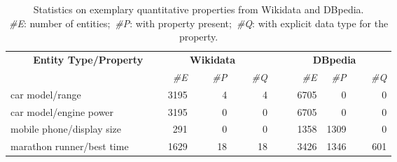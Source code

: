 \begin{table}[t]
\centering
\captionsetup{justification=centering}
\caption{Statistics on exemplary quantitative properties from Wikidata and DBpedia.\\ %
\small{\textit{\#E}: number of entities;\ \textit{\#P}: with property present;\ \textit{\#Q}: with explicit data type for the property}.
}
\begin{tabular}{l |r r r|r r r} \midrule
 \multirow{2}{*}{\textbf{~~~~Entity Type/Property}} & \multicolumn{3}{c}{\textbf{Wikidata}} & \multicolumn{3}{|c}{\textbf{DBpedia}}  \\
 \cmidrule{2-7}
 & \textit{~~~~\#E} &  \textit{~~~\#P} & \textit{~~~\#Q~}  & \textit{~~~~\#E} &  \textit{\#P} & \textit{~~~\#Q} \\
 \midrule
car model/range & 3195  & 4 & 4~ & 6705 & 0 & 0 \\
car model/engine power & 3195 & 0 & 0~ & 6705 & 0 & 0 \\
mobile phone/display size & 291 & 0 & 0~ & 1358 & 1309 & 0 \\
marathon runner/best time~ & 1629 & 18 & 18~ & 3426 & 1346 & 601 \\
 \midrule
\end{tabular}
\label{table:kg_stats}
\end{table}
